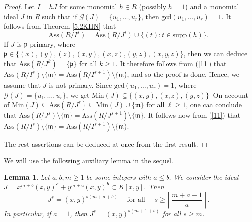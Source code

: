\documentclass[11pt]{amsart}
\newtheorem{lemma}[theorem]{Lemma}
\begin{document}
\begin{proof} 
Let   $I=hJ$ for some monomial $h \in R$ (possibly $h=1$) and a  monomial ideal $J$ in $R$  such that if $\mathcal{G}(J)=\{u_1, \ldots, u_r\}$, then 
  $\mathrm{gcd}(u_1, \ldots, u_r)=1$.    It follows from Theorem  \ref{5.2KHN} that 
  \begin{equation} \label{11}
\mathrm{Ass}(R/I^s)=\mathrm{Ass}(R/J^s) \cup \{(t) : t \in \mathrm{supp}(h)\}.
\end{equation}
If $J$ is $\mathfrak{p}$-primary, where $\mathfrak{p}\in \{(x), (y), (z), (x,y), (x,z), (y,z), (x,y,z)\}$, then we can deduce that 
$\mathrm{Ass}(R/J^k)=\{\mathfrak{p}\}$ for all $k\geq 1$. It therefore follows from  (\ref{11}) that  $\mathrm{Ass}(R/I^s)\setminus \{\mathfrak{m}\}=\mathrm{Ass}(R/I^{s+1})\setminus \{\mathfrak{m}\}$, and so 
 the proof is done. Hence,  we assume that $J$ is not primary.
 Since   $\mathrm{gcd}(u_1, \ldots, u_r)=1$, where   $\mathcal{G}(J)=\{u_1, \ldots, u_r\}$, we get    $\mathrm{Min}(J) \subseteq \{(x,y), (x,z), (y,z)\}$.
 On account of   $\mathrm{Min}(J) \subseteq \mathrm{Ass}(R/J^\ell) \subseteq \mathrm{Min}(J) \cup \{\mathfrak{m}\}$
  for all  $\ell\geq 1$, one can conclude that   $\mathrm{Ass}(R/J^s)\setminus \{\mathfrak{m}\}=\mathrm{Ass}(R/J^{s+1})\setminus \{\mathfrak{m}\}$.
 It follows now from (\ref{11}) that   $\mathrm{Ass}(R/I^s)\setminus \{\mathfrak{m}\}=\mathrm{Ass}(R/I^{s+1})\setminus \{\mathfrak{m}\}$. 
 
   The rest assertions can be deduced at once from the first result. 
\end{proof}


We will use the following auxiliary lemma in the sequel.

\begin{lemma}\label{lemm-1}
Let $a,b,m\geq 1$ be some integers  with $a\leq b$. We consider the ideal
$J = x^{m+b}(x,y)^a + y^{m+a}(x,y)^b \subset K[x,y].$
Then $$J^s = (x,y)^{s(m+a+b)}\quad  \text{ for all } \quad s\geq \left\lceil \frac{m+a-1}{a} \right\rceil.$$
In particular, if $a=1$,   then $J^s = (x,y)^{s(m+1+b)}$  for all $s\geq m$.
\end{lemma}
\end{document}
